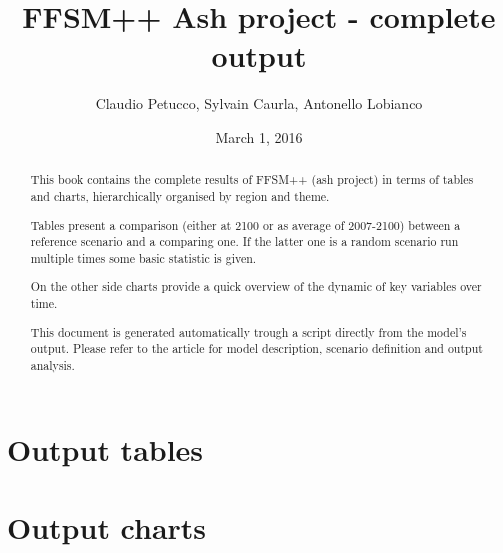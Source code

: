 \documentclass[a4paper,11pt]{paper}
\title{FFSM++ Ash project - complete output}
\author{Claudio Petucco, Sylvain Caurla, Antonello Lobianco}
\date{
March 1, 2016
}
\begin{document}
\maketitle

\begin{abstract}
This book contains the complete results of FFSM++ (ash project) in terms of tables and charts, hierarchically organised by region and theme.

Tables present a comparison (either at 2100 or as average of 2007-2100) between a reference scenario and a comparing one. If the latter one is a random scenario run multiple times some basic statistic is given.

On the other side charts provide a quick overview of the dynamic of key variables over time.

This document is generated automatically trough a script directly from the model's output. Please refer to the article for model description, scenario definition and output analysis.

\end{abstract}

\thispagestyle{empty}
\newpage
\tableofcontents
\thispagestyle{empty}
\newpage
\part[Tables]{Output tables}

\clearpage
\newpage
\part[Charts]{Output charts}



%
\end{document}
